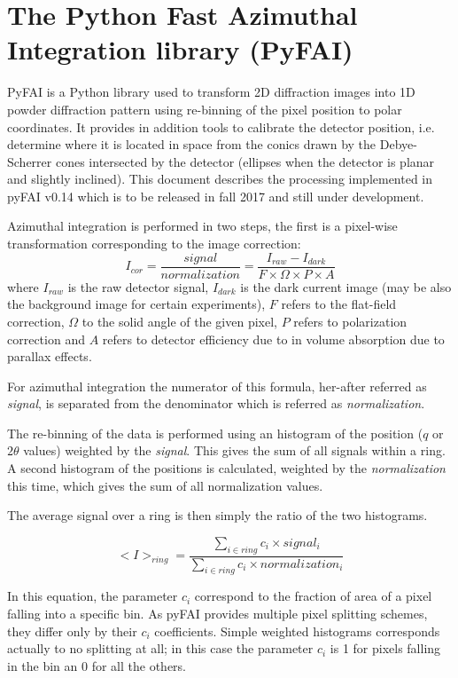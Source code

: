\documentclass[preprint, pdf]{iucr}              %
\begin{document}
\section{The Python Fast Azimuthal Integration library (PyFAI)}

PyFAI is a Python \cite{python} library used to transform 2D diffraction images into
1D powder diffraction pattern using re-binning of the pixel position to polar coordinates.
It provides in addition tools to calibrate the detector position, i.e. determine
where it is located in space from the conics drawn by the Debye-Scherrer cones
intersected by the detector (ellipses when the detector is planar and slightly
inclined). This document describes the processing implemented in pyFAI
v0.14 which is to be released in fall 2017 and still under development.

Azimuthal integration is performed in two steps, the first is a pixel-wise
transformation corresponding to the image correction:
$$
I_{cor} = \frac{signal}{normalization}  = \frac{I_{raw} - I_{dark}}{F \times
\Omega \times P \times A } $$
where $I_{raw}$ is the raw detector signal, $I_{dark}$ is the dark current
image (may be also the background image for certain experiments), $F$ refers to
the flat-field correction, $\Omega$ to the solid angle of the given pixel, $P$
refers to polarization correction and $A$ refers to detector efficiency due
to in volume absorption due to parallax effects.

For azimuthal integration the numerator of this formula, her-after referred as
\textit{signal}, is separated from the denominator which is referred as
\textit{normalization}.

The re-binning of the data is performed using an histogram of the position ($q$
or $2\theta$ values) weighted by the \textit{signal}.
This gives the sum of all signals within a ring.
A second histogram of the positions is calculated, weighted by the
\textit{normalization} this time, which gives the sum of all normalization
values.

The average signal over a ring is then simply the ratio of the two histograms.

$$
<I>_{ring} = \frac{\sum\limits_{i \in ring} c_i \times signal_i}
                  {\sum\limits_{i \in ring} c_i \times normalization_i} 
$$

In this equation, the parameter $c_i$ correspond to the fraction of area of a
pixel falling into a specific bin. 
As pyFAI provides multiple pixel splitting schemes, they differ only by their
$c_i$ coefficients. 
Simple weighted histograms corresponds actually to no splitting at all; in this
case the parameter $c_i$ is 1 for pixels falling in the bin an 0 for all the
others.
  
\end{document}

